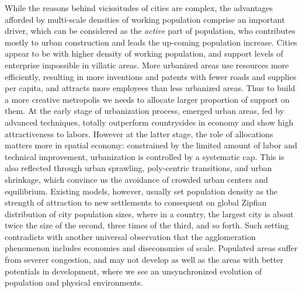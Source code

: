 \documentclass[reprint,unsortedaddress,amsmath,amssymb,aps,prl,showkeys]{revtex4-2}
\begin{document}
While the reasons behind vicissitudes of cities are complex, the advantages afforded by multi-scale densities of working population comprise an important driver\cite{smith1937wealth,fujita1999spatial}, which can be considered as the \emph{active} part of population, who contributes mostly to urban construction and leads the up-coming population increase. Cities appear to be with higher density of working population, and support levels of enterprise impossible in villatic areas. More urbanized areas use resources more efficiently, resulting in more inventions and patents with fewer roads and supplies per capita\cite{fujita1999spatial,becker1999population,bettencourt2007growth,batty2019urbanscalinglaw}, and attracts more employees than less urbanized areas. Thus to build a more creative metropolis we needs to allocate larger proportion of support on them. At the early stage of urbanization process, emerged urban areas, fed by advanced techniques, totally outperform countrysides in economy and show high attractiveness to labors. However at the latter stage, the role of allocations matters more in spatial economy: constrained by the limited amount of labor and technical improvement, urbanization is controlled by a systematic cap. This is also reflected through urban sprawling, poly-centric transitions\cite{roth2011structure}, and urban shrinkage, which convince us the avoidance of crowded urban centers and equilibrium. Existing models, however, usually set population density as the strength of attraction to new settlements\cite{PhysRevX.4.011008,PhysRevLett.79.523,foster2010communities,pan2013urban,Li2017Simple} to consequent on global Zipfian distribution of city population sizes\cite{zipf1949human}, where in a country, the largest city is about twice the size of the second, three times of the third, and so forth. Such setting contradicts with another universal observation that the agglomeration phenomenon includes economies and diseconomies of scale\cite{batty2019urbanscalinglaw}. Populated areas suffer from severer congestion, and may not develop as well as the areas with better potentials in development, where we see an unsynchronized evolution of population and physical environments\cite{doi:10.1177/0042098010396239,gu2001social}. 

\end{document}
